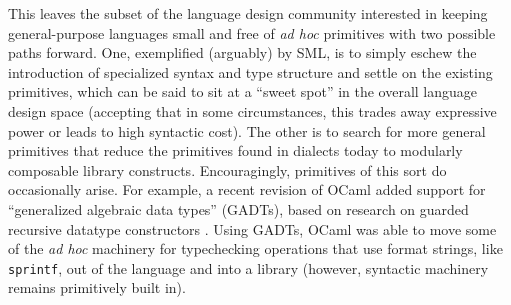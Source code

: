 
This leaves the subset of the  language design community interested in keeping general-purpose languages small and free of \emph{ad hoc} primitives with two possible paths forward. One, exemplified (arguably) by SML, is to simply eschew the introduction of specialized syntax and type structure and settle on the existing primitives, which can be said to sit at a ``sweet spot'' in the overall language design space (accepting that in some circumstances, this trades away expressive power or leads to  high syntactic cost). %
The other is to search for more general primitives that reduce the primitives found in dialects today to modularly composable library constructs. %
Encouragingly, primitives of this sort do occasionally arise. For example, a recent revision of OCaml added support for  ``generalized algebraic data types'' (GADTs), based on research on guarded recursive datatype constructors \cite{XiCheChe03}. Using GADTs, OCaml was able to move some of the \emph{ad hoc} machinery for typechecking operations that use format strings, like \texttt{sprintf}, out of the language and into a library (however, syntactic machinery remains primitively built in). 

